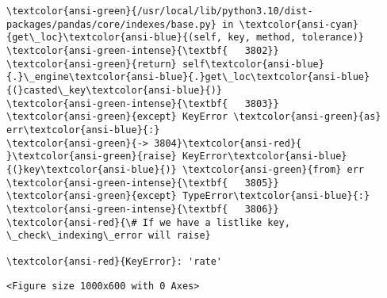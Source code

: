 \documentclass[11pt]{article}
\begin{document}
\begin{Verbatim}[commandchars=\\\{\}, frame=single, framerule=2mm, rulecolor=\color{outerrorbackground}]
\textcolor{ansi-green}{/usr/local/lib/python3.10/dist-packages/pandas/core/indexes/base.py} in \textcolor{ansi-cyan}{get\_loc}\textcolor{ansi-blue}{(self, key, method, tolerance)}
\textcolor{ansi-green-intense}{\textbf{   3802}}                 \textcolor{ansi-green}{return} self\textcolor{ansi-blue}{.}\_engine\textcolor{ansi-blue}{.}get\_loc\textcolor{ansi-blue}{(}casted\_key\textcolor{ansi-blue}{)}
\textcolor{ansi-green-intense}{\textbf{   3803}}             \textcolor{ansi-green}{except} KeyError \textcolor{ansi-green}{as} err\textcolor{ansi-blue}{:}
\textcolor{ansi-green}{-> 3804}\textcolor{ansi-red}{                 }\textcolor{ansi-green}{raise} KeyError\textcolor{ansi-blue}{(}key\textcolor{ansi-blue}{)} \textcolor{ansi-green}{from} err
\textcolor{ansi-green-intense}{\textbf{   3805}}             \textcolor{ansi-green}{except} TypeError\textcolor{ansi-blue}{:}
\textcolor{ansi-green-intense}{\textbf{   3806}}                 \textcolor{ansi-red}{\# If we have a listlike key, \_check\_indexing\_error will raise}

\textcolor{ansi-red}{KeyError}: 'rate'
    \end{Verbatim}

    
    \begin{Verbatim}[commandchars=\\\{\}]
<Figure size 1000x600 with 0 Axes>
    \end{Verbatim}

    

    
    
    
\end{document}
